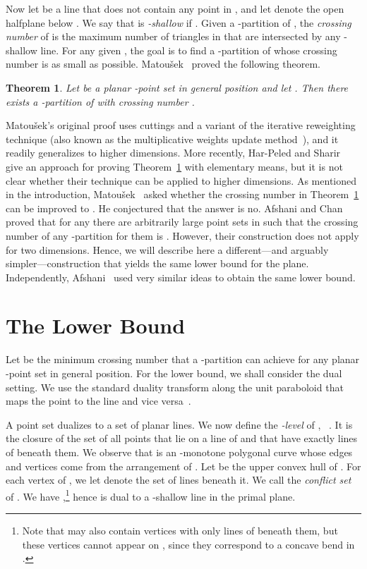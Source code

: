 \documentclass{paper}
\newcommand\matousek{{Matou{\v{s}}ek}}
\newtheorem {theorem} {Theorem}[section]
\begin{document}
Now let    be a line that does not contain any point in , and let
 denote the open halfplane below . 
We say that  is \emph{-shallow} if 
. Given a -partition 
of , the \emph{crossing number} of  is the 
maximum number of triangles in  that are intersected
by any -shallow line. For any given , the goal is to find 
a -partition of  whose crossing number is as small as possible.
\matousek~\cite[Theorem~3.1]{Matousek92} 
proved the following theorem.
\begin{theorem} 
\label{thm:shallowpart}
Let  be a planar -point set in general position and let 
. Then there exists a -partition of  with crossing number
. \hfill
\end{theorem}

\matousek's original proof uses cuttings and a variant of the 
iterative reweighting technique (also known as the multiplicative weights 
update method~\cite{AroraHaKa10}), and it readily generalizes to higher 
dimensions. 
More recently, Har-Peled and Sharir~\cite[Lemma~3.3]{HarPeledSh11} give
an approach for proving Theorem~\ref{thm:shallowpart} with elementary 
means, but it is not clear whether their technique can be applied to 
higher dimensions. As mentioned in the introduction, 
\matousek~\cite{Matousek92} 
asked whether
the crossing number in Theorem~\ref{thm:shallowpart} can be
improved to . He conjectured that the answer is no. 
Afshani and Chan~\cite{AfshaniCh09} proved that for any  there are
arbitrarily large point sets
in  such that the crossing number
of any -partition for them is 
. 
However, their construction
does not apply for two dimensions. 
Hence, we will describe here a different---and arguably simpler---construction
that yields the same lower bound for the plane.
Independently, Afshani~\cite{Afshani10} used very similar ideas to
obtain the same lower bound.

\section{The Lower Bound}

Let  be the minimum crossing number that
a -partition can achieve for any planar -point set
in general position. 
For the lower bound, we shall consider the dual setting. 
We use the standard duality 
transform along the unit paraboloid that maps the point 
 to the line  and vice
versa~\cite{Mulmuley94}.

A point set  dualizes to a set  of planar lines. We now
define the \emph{-level} of , ~\cite{SharirAg95}. 
It is the closure of the set 
of all points that lie on a line of  and 
that have exactly  lines of  beneath them. 
We observe that  is an -monotone polygonal curve 
whose edges and vertices come from the arrangement
of . 
Let  be the upper convex hull of .
For each vertex  of , we let  
denote the set of lines
beneath it. We call  the \emph{conflict set} of . 
We have ,\footnote{Note 
that  may also contain vertices with
only  lines of  beneath them, but these vertices
cannot appear on , since they correspond to
a concave bend in .} 
hence  is dual to
a -shallow line  in the primal plane.
\end{document}
